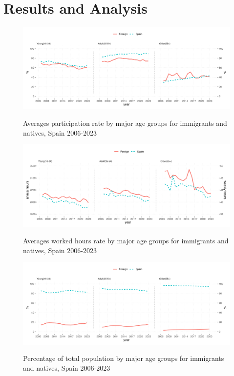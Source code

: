 \section{Results and Analysis}

\begin{figure}[H]%
    \caption{Averages participation rate by major age groups for immigrants and natives, Spain 2006-2023}
    \includegraphics[width=1\textwidth]{../graph/wpx.png}%
    \label{fig:labDecomp}%
\end{figure}%
  


\begin{figure}[H]%
    \caption{Averages worked hours rate by major age groups for immigrants and natives, Spain 2006-2023}
    \includegraphics[width=1\textwidth]{../graph/whx.png}%
    \label{fig:labDecomp}%
\end{figure}%

\begin{figure}[H]%
    \caption{Percentage of total population by major age groups for immigrants and natives, Spain 2006-2023}
    \includegraphics[width=1\textwidth]{../graph/stx.png}%
    \label{fig:labDecomp}%
\end{figure}%